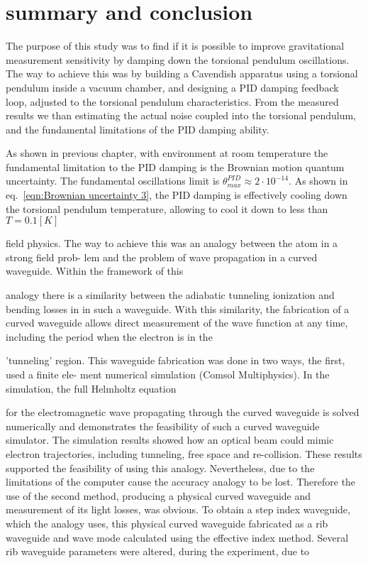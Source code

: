 \documentclass[\main/master.tex]{subfiles}
\begin{document}
\chapter{summary and conclusion}\label{chp:summary and conclusion}
The purpose of this study was to find if it is possible to improve gravitational measurement sensitivity by damping down the torsional pendulum oscillations. The way to achieve this was by building a Cavendish apparatus using a torsional pendulum inside a vacuum chamber, and designing a PID damping feedback loop, adjusted to the torsional pendulum characteristics. From the measured results we than estimating the actual noise coupled into the torsional pendulum, and the fundamental limitations of the PID damping ability.
\par\noindent
As shown in previous chapter, with environment at room temperature the fundamental limitation to the PID damping is the Brownian motion quantum uncertainty. The fundamental oscillations limit is $\theta_{max}^{PID}\approx 2\cdot 10^{-14}$. As shown in eq.~\ref{eqn:Brownian uncertainty 3}, the PID damping is effectively cooling down the torsional pendulum temperature, allowing to cool it down to less than $T=0.1[K]$
\par\noindent



field physics. The way to achieve this was an analogy between the atom in a strong field prob-
lem and the problem of wave propagation in a curved waveguide. Within the framework of this

analogy there is a similarity between the adiabatic tunneling ionization and bending losses in
in such a waveguide. With this similarity, the fabrication of a curved waveguide allows direct
measurement of the wave function at any time, including the period when the electron is in the

’tunneling’ region. This waveguide fabrication was done in two ways, the first, used a finite ele-
ment numerical simulation (Comsol Multiphysics). In the simulation, the full Helmholtz equation

for the electromagnetic wave propagating through the curved waveguide is solved numerically
and demonstrates the feasibility of such a curved waveguide simulator. The simulation results
showed how an optical beam could mimic electron trajectories, including tunneling, free space
and re-collision. These results supported the feasibility of using this analogy. Nevertheless,
due to the limitations of the computer cause the accuracy analogy to be lost. Therefore the use
of the second method, producing a physical curved waveguide and measurement of its light
losses, was obvious. To obtain a step index waveguide, which the analogy uses, this physical
curved waveguide fabricated as a rib waveguide and wave mode calculated using the effective
index method. Several rib waveguide parameters were altered, during the experiment, due to
\end{document}
